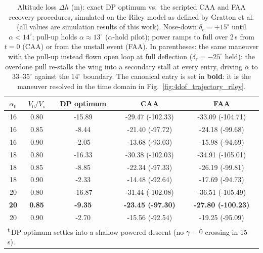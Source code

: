 \begin{table}[!ht]
    \centering
    \caption{Altitude loss $\Delta h$ (m): exact DP optimum vs.\ the scripted CAA and FAA recovery procedures, simulated on the Riley model as defined by Gratton et al. (all values are simulation results of this work). Nose-down $\delta_e=+15^\circ$ until $\alpha<14^\circ$; pull-up holds $\alpha\approx13^\circ$ ($\alpha$-hold pilot); power ramps to full over 2\,s from $t=0$ (CAA) or from the unstall event (FAA). In parentheses: the same maneuver with the pull-up instead flown open loop at full deflection ($\delta_e=-25^\circ$ held): the overdone pull re-stalls the wing into a secondary stall at every entry, driving $\alpha$ to $33$--$35^\circ$ against the $14^\circ$ boundary. The canonical entry is set in \textbf{bold}: it is the maneuver resolved in the time domain in Fig.~\ref{fig:4dof_trajectory_riley}.}
    \label{tab:maneuvers}
    \begin{tabular}{ccccc}
        \hline
        $\alpha_0$ & $V_0/V_s$ & DP optimum & CAA & FAA \\
        \hline
        16 & 0.80 & -15.89 & -29.47 (-102.33) & -33.09 (-104.71) \\
        16 & 0.85 & -8.44 & -21.40 (-97.72) & -24.18 (-99.68) \\
        16 & 0.90 & -2.05 & -13.68 (-93.03) & -15.98 (-94.69) \\
        18 & 0.80 & -16.33 & -30.38 (-102.03) & -34.91 (-105.01) \\
        18 & 0.85 & -8.85 & -22.34 (-97.33) & -26.19 (-99.81) \\
        18 & 0.90 & -2.33 & -14.48 (-92.64) & -17.69 (-94.73) \\
        20 & 0.80 & -16.87 & -31.44 (-102.08) & -36.51 (-105.49) \\
        \bfseries 20 & \bfseries 0.85 & \bfseries -9.35 & \bfseries -23.45 (-97.30) & \bfseries -27.80 (-100.23) \\
        20 & 0.90 & -2.70 & -15.56 (-92.54) & -19.25 (-95.09) \\
        \hline
        \multicolumn{5}{l}{\footnotesize\textsuperscript{t}\,DP optimum settles into a shallow powered descent (no $\gamma=0$ crossing in 15\,s).}\\
    \end{tabular}
\end{table}
